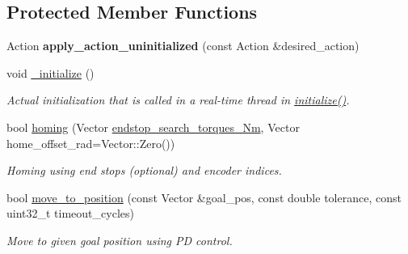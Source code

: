 \subsection*{Protected Member Functions}
\begin{DoxyCompactItemize}
\item 
Action {\bfseries apply\+\_\+action\+\_\+uninitialized} (const Action \&desired\+\_\+action)\hypertarget{classblmc__robots_1_1NJointBlmcRobotDriver_a51acd154a4769b2fbc35536fc32ca354}{}\label{classblmc__robots_1_1NJointBlmcRobotDriver_a51acd154a4769b2fbc35536fc32ca354}

\item 
void \hyperlink{classblmc__robots_1_1NJointBlmcRobotDriver_a23e443e175d91b66cb4e50fa87bbf0fa}{\+\_\+initialize} ()
\begin{DoxyCompactList}\small\item\em Actual initialization that is called in a real-\/time thread in \hyperlink{classblmc__robots_1_1NJointBlmcRobotDriver_a41b2ff96e0a687b0e1ae06ce1502d4db}{initialize()}. \end{DoxyCompactList}\item 
bool \hyperlink{classblmc__robots_1_1NJointBlmcRobotDriver_a2ec7dc99b82c474a1a16df37f5dee292}{homing} (Vector \hyperlink{n__joint__blmc__robot__driver_8hpp_a8f0c3d2c5211dc9fd38c4d64bdcf77cb}{endstop\+\_\+search\+\_\+torques\+\_\+\+Nm}, Vector home\+\_\+offset\+\_\+rad=Vector\+::\+Zero())
\begin{DoxyCompactList}\small\item\em Homing using end stops (optional) and encoder indices. \end{DoxyCompactList}\item 
bool \hyperlink{classblmc__robots_1_1NJointBlmcRobotDriver_a1defedb3825ccac7cd8511d209bcae61}{move\+\_\+to\+\_\+position} (const Vector \&goal\+\_\+pos, const double tolerance, const uint32\+\_\+t timeout\+\_\+cycles)
\begin{DoxyCompactList}\small\item\em Move to given goal position using PD control. \end{DoxyCompactList}\end{DoxyCompactItemize}
